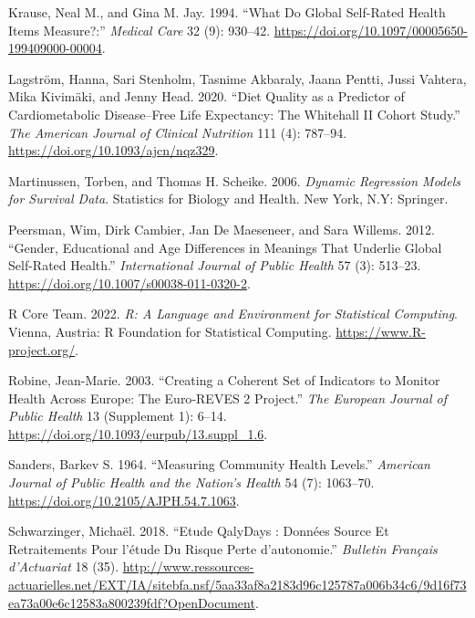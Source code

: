 \documentclass{article}
\newlength{\cslhangindent}
\newlength{\cslentryspacingunit} %
\newenvironment{CSLReferences}[2] %
 {%
  \setlength{\parindent}{0pt}
  \ifodd #1
  \let\oldpar\par
  \def\par{\hangindent=\cslhangindent\oldpar}
  \fi
  \setlength{\parskip}{#2\cslentryspacingunit}
 }%
 {}
\begin{document}
\begin{CSLReferences}{1}{0}
\leavevmode{}%
Krause, Neal M., and Gina M. Jay. 1994. {``What {Do} {Global}
{Self}-{Rated} {Health} {Items} {Measure}?:''} \emph{Medical Care} 32
(9): 930--42. \url{https://doi.org/10.1097/00005650-199409000-00004}.

\leavevmode{}%
Lagström, Hanna, Sari Stenholm, Tasnime Akbaraly, Jaana Pentti, Jussi
Vahtera, Mika Kivimäki, and Jenny Head. 2020. {``Diet Quality as a
Predictor of Cardiometabolic Disease--Free Life Expectancy: The
{Whitehall} {II} Cohort Study.''} \emph{The American Journal of Clinical
Nutrition} 111 (4): 787--94. \url{https://doi.org/10.1093/ajcn/nqz329}.

\leavevmode{}%
Martinussen, Torben, and Thomas H. Scheike. 2006. \emph{Dynamic
Regression Models for Survival Data}. Statistics for Biology and Health.
New York, N.Y: Springer.

\leavevmode{}%
Peersman, Wim, Dirk Cambier, Jan De Maeseneer, and Sara Willems. 2012.
{``Gender, Educational and Age Differences in Meanings That Underlie
Global Self-Rated Health.''} \emph{International Journal of Public
Health} 57 (3): 513--23.
\url{https://doi.org/10.1007/s00038-011-0320-2}.

\leavevmode{}%
R Core Team. 2022. \emph{R: {A} {Language} and {Environment} for
{Statistical} {Computing}}. Vienna, Austria: R Foundation for
Statistical Computing. \url{https://www.R-project.org/}.

\leavevmode{}%
Robine, Jean-Marie. 2003. {``Creating a Coherent Set of Indicators to
Monitor Health Across {Europe}: {The} {Euro}-{REVES} 2 Project.''}
\emph{The European Journal of Public Health} 13 (Supplement 1): 6--14.
\url{https://doi.org/10.1093/eurpub/13.suppl_1.6}.

\leavevmode{}%
Sanders, Barkev S. 1964. {``Measuring Community Health Levels.''}
\emph{American Journal of Public Health and the Nation's Health} 54 (7):
1063--70. \url{https://doi.org/10.2105/AJPH.54.7.1063}.

\leavevmode{}%
Schwarzinger, Michaël. 2018. {``Etude {QalyDays} : Données Source Et
Retraitements Pour l'étude Du Risque Perte d'autonomie.''}
\emph{Bulletin Français d'Actuariat} 18 (35).
\url{http://www.ressources-actuarielles.net/EXT/IA/sitebfa.nsf/5aa33af8a2183d96c125787a006b34c6/9d16f73ea73a00e6c12583a800239fdf?OpenDocument}.


\end{CSLReferences}
\end{document}
